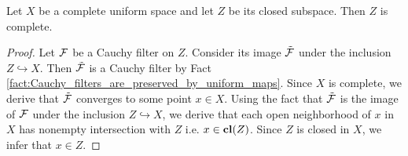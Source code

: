 \documentclass[10pt]{amsart}
\begin{document}
\begin{theorem}\label{theorem:completeness_is_inheritied_by_closed_subspaces}
	Let $X$ be a complete uniform space and let $Z$ be its closed subspace. Then $Z$ is complete.
\end{theorem}
\begin{proof}
	Let ${\mathcal F}$ be a Cauchy filter on $Z$. Consider its image $\tilde{{\mathcal F}}$ under the inclusion $Z\hookrightarrow X$. Then $\tilde{{\mathcal F}}$ is a Cauchy filter by Fact \ref{fact:Cauchy_filters_are_preserved_by_uniform_maps}. Since $X$ is complete, we derive that $\tilde{{\mathcal F}}$ converges to some point $x \in X$. Using the fact that $\tilde{{\mathcal F}}$ is the image of ${\mathcal F}$ under the inclusion $Z\hookrightarrow X$, we derive that each open neighborhood of $x$ in $X$ has nonempty intersection with $Z$ i.e. $x\in \mathbf{cl}(Z)$. Since $Z$ is closed in $X$, we infer that $x \in Z$.
\end{proof}
\end{document}
